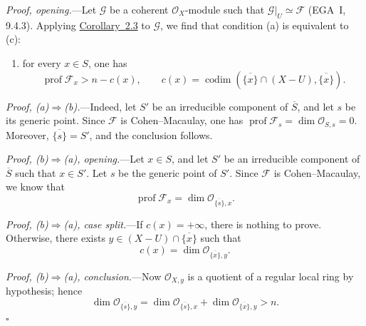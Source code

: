 \documentclass[11pt,a4paper,oneside]{book}
\providecommand{\cF}{\mathcal F}
\providecommand{\cG}{\mathcal G}
\providecommand{\cO}{\mathcal O}
\providecommand{\prof}{\operatorname{prof}}
\providecommand{\codimn}{\operatorname{codim}}
\theoremstyle{plain}
\theoremstyle{definition}
\theoremstyle{remark}
\begin{document}

\medskip
\noindent\textit{Proof, opening.}---Let $\cG$ be a coherent $\cO_X$-module
such that $\cG|_U\simeq\cF$ (EGA~I, 9.4.3). Applying \hyperref[VIII.2.3]{Corollary~2.3} to
$\cG$, we find that condition \textup{(a)} is equivalent to \textup{(c)}:
\begin{enumerate}
\item[(c)] for every $x\in S$, one has
\[
  \prof\cF_x>n-c(x),
  \qquad
  c(x)=\codimn(\overline{\{x\}}\cap (X-U),\overline{\{x\}}).
\]
\end{enumerate}


\medskip
\noindent\textit{Proof, \textup{(a)}$\Rightarrow$\textup{(b)}.}---Indeed,
let $S'$ be an irreducible component of $\overline S$, and let $s$ be its
generic point. Since $\cF$ is Cohen--Macaulay, one has
$\prof \cF_s=\dim\cO_{S,s}=0$. Moreover, $\overline{\{s\}}=S'$, and the
conclusion follows.


\medskip
\noindent\textit{Proof, \textup{(b)}$\Rightarrow$\textup{(a)}, opening.}---Let
$x\in S$, and let $S'$ be an irreducible component of $\overline S$ such that
$x\in S'$. Let $s$ be the generic point of $S'$. Since $\cF$ is
Cohen--Macaulay, we know that
\[
  \prof \cF_x=\dim\cO_{\overline{\{s\}},x}.
\]

\medskip
\noindent\textit{Proof, \textup{(b)}$\Rightarrow$\textup{(a)}, case
split.}---If $c(x)=+\infty$, there is nothing to prove. Otherwise, there exists
$y\in (X-U)\cap\overline{\{x\}}$ such that
\[
  c(x)=\dim\cO_{\overline{\{x\}},y}.
\]

\medskip
\noindent\textit{Proof, \textup{(b)}$\Rightarrow$\textup{(a)},
conclusion.}---Now $\cO_{X,y}$ is a quotient of a regular local ring by
hypothesis; hence
\[
  \dim\cO_{\overline{\{s\}},y}
  =\dim\cO_{\overline{\{s\}},x}
   +\dim\cO_{\overline{\{x\}},y}>n.
\]
\hfill$\square$

\end{document}
